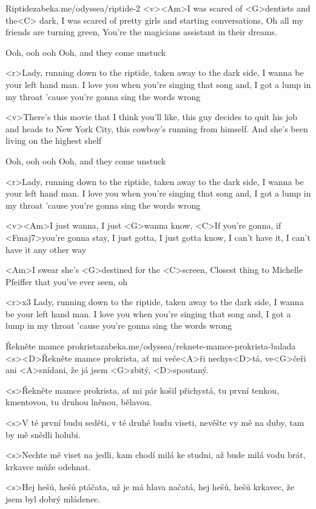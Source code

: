 \begin{song}{48}{Riptide}{zabeka.me/odyssea/riptide-2}
<v><Am>I was scared of <G>dentists and the<C> dark,
I was scared of pretty girls and starting conversations,
Oh all my friends are turning green,
You're the magicians assistant in their dreams.

Ooh, ooh ooh
Ooh, and they come unstuck

<r>Lady, running down to the riptide,
taken away to the dark side,
I wanna be your left hand man.
I love you when you're singing that song and,
I got a lump in my throat 'cause
you're gonna sing the words wrong

<v>There's this movie that I think you'll like,
this guy decides to quit his job and heads to New York City,
this cowboy's running from himself.
And she's been living on the highest shelf

Ooh, ooh ooh
Ooh, and they come unstuck

<r>Lady, running down to the riptide,
taken away to the dark side,
I wanna be your left hand man.
I love you when you're singing that song and,
I got a lump in my throat 'cause
you're gonna sing the words wrong

<v><Am>I just wanna, I just <G>wanna know,
<C>If you're gonna, if <Fmaj7>you're gonna stay,
I just gotta, I just gotta know,
I can't have it, I can't have it any other way

<Am>I swear she's <G>destined for the <C>screen,
Closest thing to Michelle Pfeiffer that you've ever seen, oh

<r>x3 
Lady, running down to the riptide,
taken away to the dark side,
I wanna be your left hand man.
I love you when you're singing that song and,
I got a lump in my throat 'cause
you're gonna sing the words wrong
\end{song}
\begin{song}{49}{Řekněte mamce prokrista}{zabeka.me/odyssea/reknete-mamce-prokrista-balada}
<s><D>Řekněte mamce prokrista, ať mi veče<A>ři nechys<D>tá,
ve<G>čeři ani <A>snídani, že já jsem <G>zbitý, <D>spoutaný. 

<s>Řekněte mamce prokrista, ať mi pár košil přichystá, 
tu první tenkou, kmentovou, tu druhou lněnou, bělavou. 

<s>V té první budu seděti, v té druhé budu viseti, 
nevěšte vy mě na duby, tam by mě snědli holubi. 

<s>Nechte mě viset na jedli, kam chodí milá ke studni, 
až bude milá vodu brát, krkavce může odehnat. 

<s>Hej hešů, hešů ptáčata, už je má hlava načatá, 
hej hešů, hešů krkavec, že jsem byl dobrý mládenec. 

\end{song}
